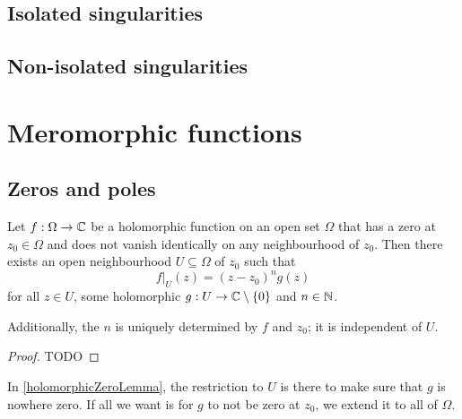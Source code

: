 \subsection{Isolated singularities}

\subsection{Non-isolated singularities}

\section{Meromorphic functions}
\subsection{Zeros and poles}
\begin{lemma} \label{holomorphicZeroLemma}
Let $f:\Omega\to \mathbb{C}$ be a holomorphic function on an open set $\Omega$ that has a zero at $z_0\in \Omega$ and does not vanish identically on any neighbourhood of $z_0$. Then there exists an open neighbourhood $U\subseteq \Omega$ of $z_0$ such that
\[ f|_U(z) = (z-z_0)^ng(z) \]
for all $z\in U$, some holomorphic $g:U\to \mathbb{C}\setminus\{0\}$ and $n\in \mathbb{N}$.

Additionally, the $n$ is uniquely determined by $f$ and $z_0$; it is independent of $U$.
\end{lemma}
\begin{proof}
TODO
\end{proof}

In \ref{holomorphicZeroLemma}, the restriction to $U$ is there to make sure that $g$ is nowhere zero. If all we want is for $g$ to not be zero at $z_0$, we extend it to all of $\Omega$.

